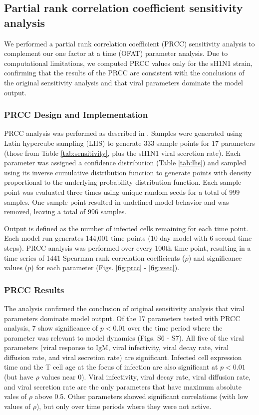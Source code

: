 \documentclass[preprint,10pt,authoryear]{article}
\begin{document}
\subsection{Partial rank correlation coefficient sensitivity analysis}

We performed a partial rank correlation coefficient (PRCC) sensitivity analysis to complement our one factor at a time (OFAT) parameter analysis.  Due to computational limitations, we computed PRCC values only for the sH1N1 strain, confirming that the results of the PRCC are consistent with the conclusions of the original sensitivity analysis and that viral parameters dominate the model output.

\subsubsection{PRCC Design and Implementation}

PRCC analysis was performed as described in \cite{Marino2008}.  Samples were generated using Latin hypercube sampling (LHS) to generate 333 sample points for 17 parameters (those from Table \ref{tab:sensitivity}, plus the sH1N1 viral secretion rate).  Each parameter was assigned a confidence distribution (Table \ref{tab:lhs}) and sampled using its inverse cumulative distribution function to generate points with density proportional to the underlying probability distribution function.  Each sample point was evaluated three times using unique random seeds for a total of 999 samples.  One sample point resulted in undefined model behavior and was removed, leaving a total of 996 samples.

Output is defined as the number of infected cells remaining for each time point.  Each model run generates 144,001 time points (10 day model with 6 second time steps).  PRCC analysis was performed over every 100th time point, resulting in a time series of 1441 Spearman rank correlation coefficients ($\rho$) and significance values ($p$) for each parameter (Figs. \ref{fig:prcc} - \ref{fig:vsec}).

\subsubsection{PRCC Results}

The  analysis confirmed the conclusion of original sensitivity analysis that viral parameters dominate model output.  Of the 17 parameters tested with PRCC analysis, 7 show significance of $p < 0.01$ over the time period where the parameter was relevant to model dynamics (Figs. S6 - S7).  All five of the viral parameters (viral response to IgM, viral infectivity, viral decay rate, viral diffusion rate, and viral secretion rate) are significant.  Infected cell expression time and the T cell age at the focus of infection are also significant at $p < 0.01$ (but have $\rho$ values near 0).  Viral infectivity, viral decay rate, viral diffusion rate, and viral secretion rate are the only parameters that have maximum absolute vales of $\rho$ above 0.5.  Other parameters showed significant correlations (with low values of $\rho$), but only over time periods where they were not active.
\end{document}
